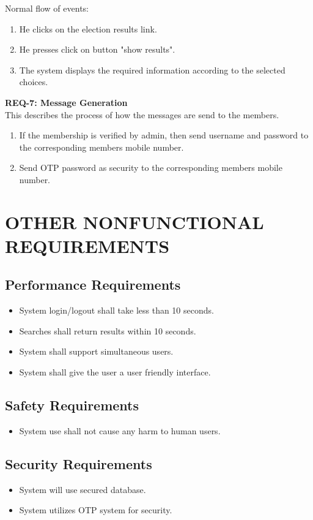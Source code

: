 \documentclass[12pt,a4paper,oneside]{report}
\begin{document}
Normal flow of events: 
\begin{enumerate}
\item He clicks on the election results link.
\item He presses click on button "show results".
\item The system displays the required information according to the selected choices. 
\end{enumerate}
\par \textbf{REQ-7: Message Generation }\\
This describes the process of how the messages are send to the members.
\begin{enumerate}
\item If the membership is verified by admin, then send username and password to the corresponding members mobile number.
\item Send OTP password as  security to the corresponding members mobile number.
\end{enumerate} 


\chapter{OTHER NONFUNCTIONAL REQUIREMENTS} 
\section{ Performance Requirements}
\begin{itemize}


\item System login/logout shall take less than 10 seconds.
\item Searches shall return results within 10 seconds.
\item System shall support simultaneous users.
\item System shall give the user a user friendly interface.
\end{itemize}
\section{ Safety Requirements}
\begin{itemize} 
\item System use shall not cause any harm to human users. 
\end{itemize}   
\section {Security Requirements}
\begin{itemize}
\item	System will use secured database.
\item	System utilizes OTP system for security.
\end{itemize}
\newpage
\end{document}
